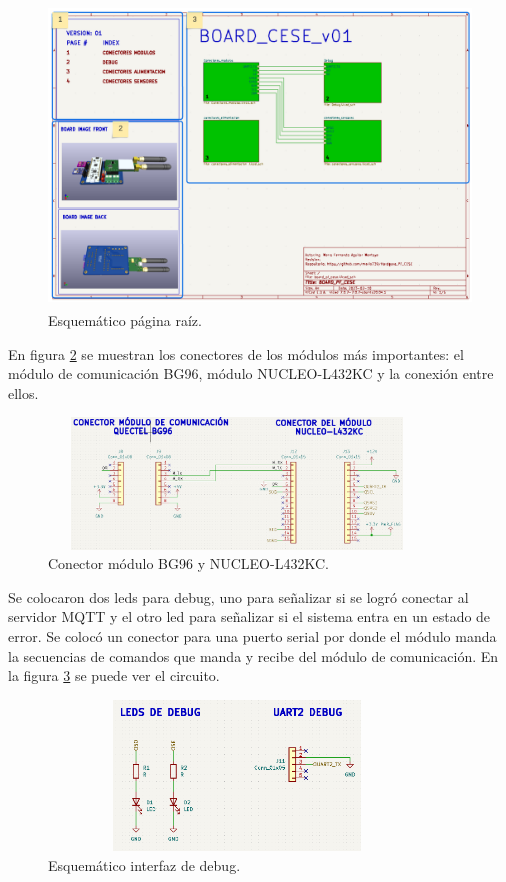 \begin{figure}[h]
  \centering
	\includegraphics[width=\textwidth, height=8cm]{./Figures/esquematico_raiz.png}
	\caption{Esquemático página raíz.}
	\label{fig:esquematico root}
\end{figure}

En figura \ref{fig:esquematico modulos} se muestran los conectores de los módulos más importantes: el módulo de comunicación BG96, módulo NUCLEO-L432KC y la conexión entre ellos.

\begin{figure}[h]
  \centering
	\includegraphics[width=10cm, height=3.5cm]{./Figures/esquematico_modulos.png}
	\caption{Conector módulo BG96 y NUCLEO-L432KC.}
	\label{fig:esquematico modulos}
\end{figure}

Se colocaron dos leds para debug, uno para señalizar si se logró conectar al servidor MQTT y el otro led para señalizar si el sistema entra en un estado de error. Se colocó un conector para una puerto serial por donde el módulo manda la secuencias de comandos que manda y recibe del módulo de comunicación. En la figura \ref{fig:esquematico conectores de debug} se puede ver el circuito.
\begin{figure}[h!]
  \centering
	\includegraphics[width=10cm, height=4cm]{./Figures/esquematico_debug.png}
	\caption{Esquemático interfaz de debug.}
	\label{fig:esquematico conectores de debug}
\end{figure}

